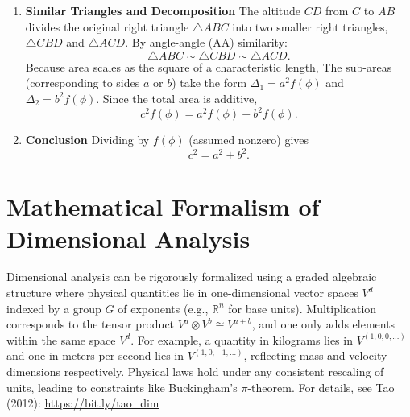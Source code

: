 {\begin{enumerate}
\begin{center}
    \end{center}
    \item \textbf{Similar Triangles and Decomposition}  
    \newline
    The altitude $CD$ from $C$ to $AB$ divides the original right triangle $\triangle ABC$ into two smaller right triangles, $\triangle CBD$ and $\triangle ACD$. By angle-angle (AA) similarity:
    \[
    \triangle ABC \sim \triangle CBD \sim \triangle ACD.
    \]
    Because area scales as the square of a characteristic length, The sub-areas (corresponding to sides $a$ or $b$) take the form $\Delta_1 = a^2 f(\phi)$ and $\Delta_2 = b^2 f(\phi)$.
    Since the total area is additive,  
    \[
    c^2 f(\phi) = a^2 f(\phi) + b^2 f(\phi).
    \]
    
    \item \textbf{Conclusion}  
    Dividing by $f(\phi)$ (assumed nonzero) gives
    \[
    c^2 = a^2 + b^2.
    \]
\end{enumerate}
\section*{Mathematical Formalism of Dimensional Analysis}  
Dimensional analysis can be rigorously formalized using a graded algebraic structure where physical quantities lie in one-dimensional vector spaces $V^d$ indexed by a group $G$ of exponents (e.g., $\mathbb{R}^n$ for base units). Multiplication corresponds to the tensor product $V^a \otimes V^b \cong V^{a+b}$, and one only adds elements within the same space $V^d$. For example, a quantity in kilograms lies in $V^{(1,0,0,\ldots)}$ and one in meters per second lies in $V^{(1,0,-1,\ldots)}$, reflecting mass and velocity dimensions respectively. Physical laws hold under any consistent rescaling of units, leading to constraints like Buckingham's $\pi$-theorem.  
For details, see Tao (2012):  
\href{https://terrytao.wordpress.com/2012/12/29/a-mathematical-formalisation-of-dimensional-analysis/}{\textrm{https://bit.ly/tao\_dim}}
}